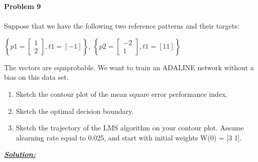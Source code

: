 \documentclass{article}
\begin{document}
\newpage
\noindent \textbf{Problem 9}
\\ \\
Suppose that we have the following two reference patterns and their targets:
\begin{center}
  ${\left \{p1 = \begin{bmatrix} 1 \\ 2\end{bmatrix}, t1 = [-1] \right \} }$, 
  ${\left \{p2 = \begin{bmatrix} -2 \\ 1\end{bmatrix}, t1 = [11] \right \} }$
\end{center}
The vectors are equiprobable. We want to train an ADALINE network without a bias on this data set.
\begin{enumerate} [label=\Alph*]
  \item Sketch the contour plot of the mean square error performance index.
  \item Sketch the optimal decision boundary.
  \item Sketch the trajectory of the LMS algorithm on your contour plot. 
        Assume alearning rate equal to 0.025, and start with initial weights W(0) = [3 1].
\end{enumerate}

\noindent \underline{\textbf{\textit{Solution:}}}
\end{document}
